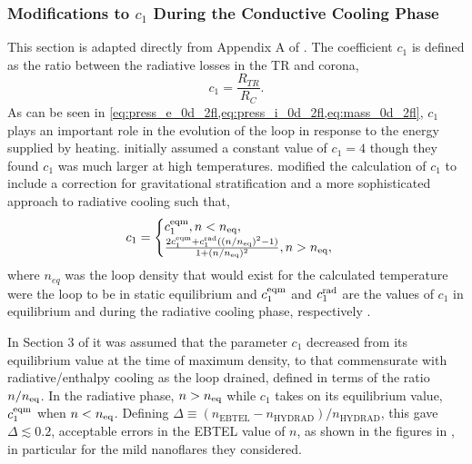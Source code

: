 \subsubsection{Modifications to $c_1$ During the Conductive Cooling Phase}\label{sec:c1-correction}

This section is adapted directly from Appendix A of \citet[\autoref{ch:inferring_hot_plasma} of this thesis]{barnes_inference_2016}. The coefficient $c_1$ is defined as the ratio between the radiative losses in the TR and corona,
\begin{equation}\label{eq:c1_def}
    c_1 = \frac{R_{TR}}{R_C}.
\end{equation}
As can be seen in \cref{eq:press_e_0d_2fl,eq:press_i_0d_2fl,eq:mass_0d_2fl}, $c_1$ plays an important role in the evolution of the loop in response to the energy supplied by heating. \citet{klimchuk_highly_2008} initially assumed a constant value of $c_1=4$ though they found $c_1$ was much larger at high temperatures. \citet{cargill_enthalpy-based_2012} modified the calculation of $c_1$ to include a correction for gravitational stratification and a more sophisticated approach to radiative cooling such that,
\begin{equation}\label{eq:c1_mod1}
    c_1 =
    \begin{cases}
        c_1^\textup{eqm}, n < n_\textup{eq}, \\
        \frac{2c_1^\textup{eqm} + c_1^\textup{rad}((n/n_\textup{eq})^2 - 1)}{1 + (n/n_\textup{eq})^2}, n > n_\textup{eq},
    \end{cases}
\end{equation} 
where $n_{eq}$ was the loop density that would exist for the calculated temperature were the loop to be in static equilibrium \citep[Equation 17 of][]{cargill_enthalpy-based_2012} and $c_1^\textup{eqm}$ and $c_1^\textup{rad}$ are the values of $c_1$ in equilibrium and during the radiative cooling phase, respectively \citep[see Equations 12 and 16 of][]{cargill_enthalpy-based_2012}. 

In Section 3 of \citet{cargill_enthalpy-based_2012} it was assumed that the parameter $c_1$ decreased from its equilibrium value at the time of maximum density, to that commensurate with radiative/enthalpy cooling as the loop drained, defined in terms of the ratio $n/n_\textup{eq}$. In the radiative phase, $n > n_\textup{eq}$ while $c_1$ takes on its equilibrium value, $c_1^\textup{eqm}$ when $n < n_\textup{eq}$. Defining $\Delta\equiv(n_{\mathrm{EBTEL}} - n_{\mathrm{HYDRAD}})/n_{\mathrm{HYDRAD}}$, this gave $\Delta\lesssim0.2$, acceptable errors in the EBTEL value of $n$, as shown in the figures in \citet{cargill_enthalpy-based_2012}, in particular for the mild nanoflares they considered.

